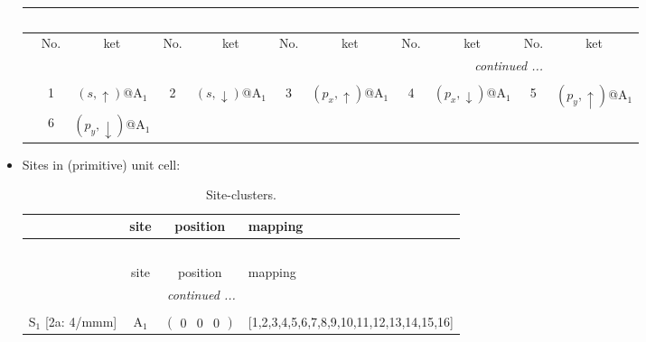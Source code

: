 \documentclass[fleqn,10pt,landscape]{article}
\begin{document}
\begin{itemize}
\begin{center}
\begin{longtable}{c|cc|cc|cc|cc|cc}
\multicolumn{10}{l}{\tablename\ \thetable{}} \\
 \hline \hline
 & No. & ket & No. & ket & No. & ket & No. & ket & No. & ket \\ \hline \endhead

 \hline \hline
\multicolumn{10}{r}{\footnotesize\it continued ...} \\ \endfoot

 \hline \hline
\multicolumn{10}{r}{} \\ \endlastfoot

 & 1 & $(s,\uparrow)$@A$_{1}$ & 2 & $(s,\downarrow)$@A$_{1}$ & 3 & $(p_{x},\uparrow)$@A$_{1}$ & 4 & $(p_{x},\downarrow)$@A$_{1}$ & 5 & $(p_{y},\uparrow)$@A$_{1}$ \\
& 6 & $(p_{y},\downarrow)$@A$_{1}$ &  &  &  &  &  &  &  &  \\
\end{longtable}
\end{center}

\item Sites in (primitive) unit cell:
\begin{center}
\renewcommand{\arraystretch}{1.3}
\begin{longtable}{cc|c|l}
\caption{Site-clusters.}
 \\
 \hline \hline
 & site & position & mapping \\ \hline \endfirsthead

\multicolumn{3}{l}{\tablename\ \thetable{}} \\
 \hline \hline
 & site & position & mapping \\ \hline \endhead

 \hline \hline
\multicolumn{3}{r}{\footnotesize\it continued ...} \\ \endfoot

 \hline \hline
\multicolumn{3}{r}{} \\ \endlastfoot

S$_{1}$ [2a: 4/mmm] & A$_1$ & $\begin{pmatrix} 0 & 0 & 0 \end{pmatrix}$ & [1,2,3,4,5,6,7,8,9,10,11,12,13,14,15,16] \\
\end{longtable}
\end{center}


\end{itemize}
\end{document}
